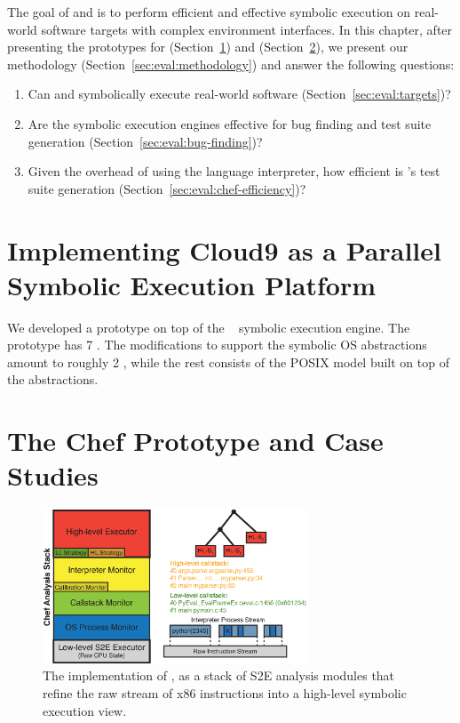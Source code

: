 The goal of \chef and \cnine is to perform efficient and effective symbolic execution on real-world software targets with complex environment interfaces.
%
In this chapter, after presenting the prototypes for \cnine (Section~\ref{sec:eval:cnine-proto}) and \chef (Section~\ref{sec:eval:chef-proto}), we present our methodology (Section~\ref{sec:eval:methodology}) and answer the following questions:
\begin{enumerate}
\item Can \chef and \cnine symbolically execute real-world software (Section~\ref{sec:eval:targets})?
\item Are the symbolic execution engines effective for bug finding and test suite generation (Section~\ref{sec:eval:bug-finding})?
\item Given the overhead of using the language interpreter, how efficient is \chef's test suite generation (Section~\ref{sec:eval:chef-efficiency})?
\end{enumerate}

\section{Implementing Cloud9 as a Parallel Symbolic Execution Platform}
\label{sec:eval:cnine-proto}


We developed a \cnine prototype on top of the \klee~\cite{klee} symbolic execution engine.  The prototype has 7 \kloc.
%
The \klee modifications to support the symbolic OS abstractions amount to roughly 2 \kloc, while the rest consists of the POSIX model built on top of the abstractions.

\section{The Chef Prototype and Case Studies}
\label{sec:eval:chef-proto}

\begin{figure}
  \centering
  \includegraphics[width=0.7\textwidth]{figures/evaluation/chef-implem-stack}
  \caption{The implementation of \chef, as a stack of S2E analysis modules that refine the raw stream of x86 instructions into a high-level symbolic execution view.}
  \label{fig:eval:chef-implem-stack}
\end{figure}

